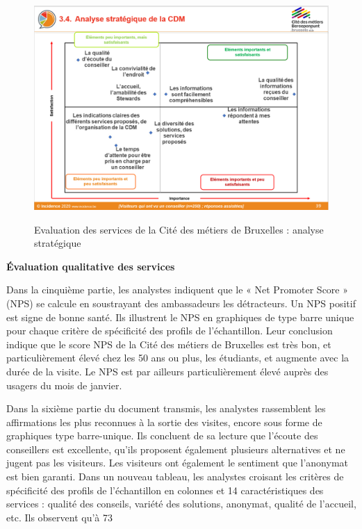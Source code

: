 \documentclass[french,a4paper,12pt]{article}
\begin{document}
{\begin{center}
\begin{figure}
\includegraphics[scale=0.5]{9-cdm-analyse.PNG}
\end{figure}
\begin{figure}[h]
\caption{Evaluation des services de la Cité des métiers de Bruxelles : analyse stratégique}
\end{figure}
\end{center}

\textbf{Évaluation qualitative des services}

\quad Dans la cinquième partie, les analystes indiquent que le « Net Promoter Score » (NPS) se calcule en soustrayant des ambassadeurs les détracteurs. Un NPS positif est signe de bonne santé. Ils illustrent le NPS en graphiques de type barre unique pour chaque critère de spécificité des profils de l’échantillon. Leur conclusion indique que le score NPS de la Cité des métiers de Bruxelles est très bon, et particulièrement élevé chez les 50 ans ou plus, les étudiants, et augmente avec la durée de la visite. Le NPS est par ailleurs particulièrement élevé auprès des usagers du mois de janvier.

\quad Dans la sixième partie du document transmis, les analystes rassemblent les affirmations les plus reconnues à la sortie des visites, encore sous forme de graphiques type barre-unique. Ils concluent de sa lecture que l’écoute des conseillers est excellente, qu’ils proposent également plusieurs alternatives et ne jugent pas les visiteurs. Les visiteurs ont également le sentiment que l’anonymat est bien garanti. Dans un nouveau tableau, les analystes croisant les critères de spécificité des profils de l’échantillon en colonnes et 14 caractéristiques des services : qualité des conseils, variété des solutions, anonymat, qualité de l’accueil, etc. Ils observent qu’à 73%

}
\end{document}
